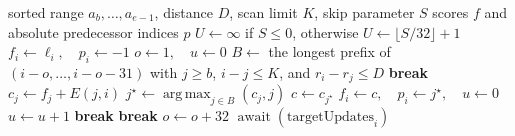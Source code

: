 \begin{algorithm}[H]
\caption{BioseqDB Vulkan forward chaining for one hard range}
\label{alg:chaining-vulkan}
\footnotesize
\begin{algorithmic}[1]
  \Require sorted range \(a_b,\ldots,a_{e-1}\), distance \(D\),
    scan limit \(K\), skip parameter \(S\)
  \Ensure scores \(f\) and absolute predecessor indices \(p\)
  \State \(U\gets\infty\) if \(S\leq0\), otherwise
    \(U\gets\lfloor S/32\rfloor+1\)
    \State \(f_i\gets\ell_i,\quad p_i\gets-1\)
    \State \(o\gets1,\quad u\gets0\)
      \State \(B\gets\) the longest prefix of
        \((i-o,\ldots,i-o-31)\) with \(j\geq b\),
        \(i-j\leq K\), and \(r_i-r_j\leq D\)
        \State \textbf{break}
      \EndIf
        \State \(c_j\gets f_j+E(j,i)\)
      \EndFor
      \State \(j^\star\gets
        \operatorname*{arg\,max}_{j\in B}(c_j,j)\)
      \State \(c\gets c_{j^\star}\)
        \State \(f_i\gets c,\quad p_i\gets j^\star,\quad u\gets0\)
        \State \(u\gets u+1\)
          \State \textbf{break}
        \EndIf
      \EndIf
        \State \textbf{break}
      \EndIf
      \State \(o\gets o+32\)
    \EndWhile
    \State \(\operatorname{await}(\mathrm{targetUpdates}_i)\)
  \EndFor
\end{algorithmic}
\end{algorithm}
